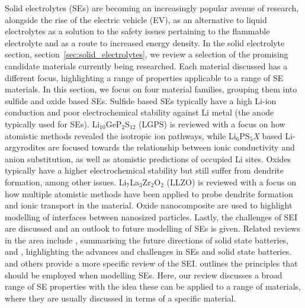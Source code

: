 \documentclass[../main.tex]{subfiles}
\begin{document}
Solid electrolytes (SEs) are becoming an increasingly popular avenue of research, alongside the rise of the electric vehicle (EV), \cite{Woods_2021} as an alternative to liquid electrolytes as a solution to the safety issues pertaining to the flammable electrolyte\cite{Shepherd_Siddiqui, Pfrang2017} and as a route to increased energy density\cite{Liu2019_e_den}. In the solid electrolyte section, section~\ref{sec:solid_electrolytes}, we review a selection of the promising candidate materials currently being researched. Each material discussed has a different focus, highlighting a range of properties applicable to a range of SE materials. In this section, we focus on four material families, grouping them into sulfide and oxide based SEs. Sulfide based SEs typically have a high Li-ion conduction and poor electrochemical stability against Li metal (the anode typically used for SEs). \cite{Zhu2015, Zhang2019se_rev} Li$_{10}$GeP$_2$S$_{12}$ (LGPS) is reviewed with a focus on how atomistic methods revealed the isotropic ion pathways, while Li$_6$PS$_5$\textit{X} based Li-argyrodites are focused towards the relationship between ionic conductivity and anion substitution, as well as atomistic predictions of occupied Li sites. Oxides typically have a higher electrochemical stability but still suffer from dendrite formation, among other issues.\cite{Zhu2015} Li$_7$La$_3$Zr$_2$O$_2$ (LLZO) is reviewed with a focus on how multiple atomistic methods have been applied to probe dendrite formation and ionic transport in the material. Oxide nanocomposite are used to highlight modelling of interfaces between nanosized particles. Lastly, the challenges of SEI are discussed and an outlook to future modelling of SEs is given. Related reviews in the area include \citeauthor{Zhang2018se_review}, \cite{Zhang2018se_review} summarising the future directions of solid state batteries, and \citeauthor{Gurung2019}, \cite{Gurung2019} highlighting the advances and challenges in SEs and solid state batteries. \citeauthor{Xiao2020interfacerev}\cite{Xiao2020interfacerev} and others\cite{Xu2018exp,Tateyama2019} provide a more specific review of the SEI. \citeauthor{Ceder2018} \cite{Ceder2018} outlines the principles that should be employed when modelling SEs. Here, our review discusses a broad range of SE properties with the idea these can be applied to a range of materials, where they are usually discussed in terms of a specific material.
\end{document}
